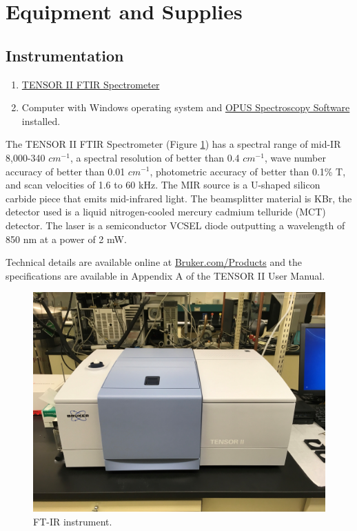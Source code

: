 \section{Equipment and Supplies}

\subsection{Instrumentation}
\begin{enumerate}
    \item \href{https://www.bruker.com/products/infrared-near-infrared-and-raman-spectroscopy/ft-ir-routine-spectrometers/tensor/overview.html}{TENSOR II FTIR Spectrometer}
    \item Computer with Windows operating system and \href{https://www.bruker.com/products/infrared-near-infrared-and-raman-spectroscopy/opus-spectroscopy-software/base-package/features.html}{OPUS Spectroscopy Software} installed.
\end{enumerate}

The TENSOR II FTIR Spectrometer (Figure \ref{FTIRphoto}) has a spectral range of mid-IR 8,000-340 $cm^{-1}$, a spectral resolution of better than 0.4 $cm^{-1}$, wave number accuracy of better than 0.01 $cm^{-1}$, photometric accuracy of better than 0.1\% T, and scan velocities of 1.6 to 60 kHz. The MIR source is a U-shaped silicon carbide piece that emits mid-infrared light. The beamsplitter material is KBr, the detector used is a liquid nitrogen-cooled mercury cadmium telluride (MCT) detector. The laser is a semiconductor VCSEL diode outputting a wavelength of 850 nm at a power of 2 mW.

Technical details are available online at \href{https://www.bruker.com/products/infrared-near-infrared-and-raman-spectroscopy/ft-ir-routine-spectrometers/tensor/technical-details.html}{Bruker.com/Products} and the specifications are available in Appendix A of the TENSOR II User Manual\cite{Bruker1}.

\begin{figure}[htb]
\begin{center}
\includegraphics[width=6.5in]{TENSOR.jpg}
\caption{FT-IR instrument.}
\label{FTIRphoto}
\end{center}
\end{figure}

